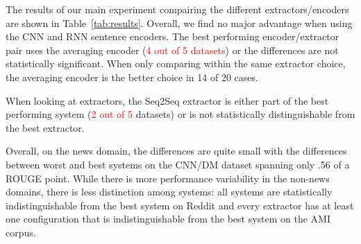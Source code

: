 

The results of our main experiment compairing 
the different extractors/encoders are shown in 
Table~\ref{tab:results}.
Overall, we find no major advantage when using the CNN and RNN sentence
encoders. The best performing encoder/extractor pair uses the averaging 
encoder (\textcolor{red}{4 out of 5 datasets}) or the differences 
are not statistically significant. When only comparing within the 
same extractor choice,  the averaging encoder is the better choice
in 14 of 20 cases. 

When looking at extractors, the Seq2Seq extractor is either part of 
the best performing system (\textcolor{red}{2 out of 5} datasets) or is not 
statistically distinguishable from the best extractor. 

Overall, on the news domain, the differences are quite small with the 
differences between worst and best systems on the CNN/DM dataset 
spanning only .56 of a ROUGE point. While there is more performance variability
 in the non-news domains, there is less distinction among systems: all systems
are statistically indistinguishable from the best system on Reddit
and every extractor has at least one configuration that is indistinguishable
from the best system on the AMI corpus.










